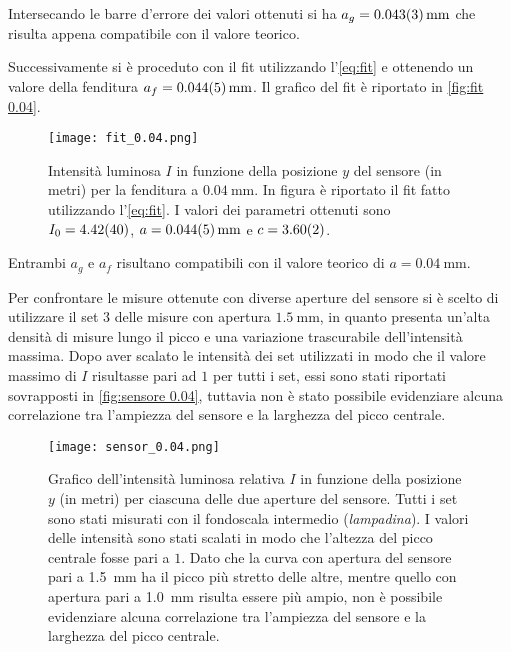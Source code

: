 \documentclass[../main.tex]{subfiles}
\begin{document}
Intersecando le barre d'errore dei valori ottenuti si ha $a_g = \qty{0.043+-0.003}{\mm}$ che risulta appena compatibile con il valore teorico.



\newpage

Successivamente si è proceduto con il fit utilizzando l'\autoref{eq:fit} e ottenendo un valore della fenditura $a_f = \qty{0.044+-0.005}{\mm}$. Il grafico del fit è riportato in \autoref{fig:fit 0.04}.

\begin{figure}[ht!]
    \centering
    \texttt{[image: fit\_0.04.png]}
    \caption{Intensità luminosa $I$ in funzione della posizione $y$ del sensore (in metri) per la fenditura a $\qty{0.04}{\mm}$. In figura è riportato il fit fatto utilizzando l'\autoref{eq:fit}. I valori dei parametri ottenuti sono $I_{0} = \num{4.42+-0.4}$, $a = \qty{0.044+-0.005}{\mm}$ e $c = \num{3.60+-0.02}$. }
    \label{fig:fit 0.04}
\end{figure}

Entrambi $a_g$ e $a_f$ risultano compatibili con il valore teorico di $a = \qty{0.04}{\mm}$.

Per confrontare le misure ottenute con diverse aperture del sensore si è scelto di utilizzare il set $3$ delle misure con apertura $\qty{1.5}{\mm}$, in quanto presenta un'alta densità di misure lungo il picco e una variazione trascurabile dell'intensità massima. Dopo aver scalato le intensità dei set utilizzati in modo che il valore massimo di $I$ risultasse pari ad $1$ per tutti i set, essi sono stati riportati sovrapposti in \autoref{fig:sensore 0.04}, tuttavia non è stato possibile evidenziare alcuna correlazione tra l'ampiezza del sensore e la larghezza del picco centrale.

\begin{figure}[ht!]
    \centering
    \texttt{[image: sensor\_0.04.png]}
    \caption{Grafico dell'intensità luminosa relativa $I$ in funzione della posizione $y$ (in metri) per ciascuna delle due aperture del sensore.
    Tutti i set sono stati misurati con il fondoscala intermedio (\textit{lampadina}). I valori delle intensità sono stati scalati in modo che l'altezza del picco centrale fosse pari a $1$.
    Dato che la curva con apertura del sensore pari a \qty{1.5}{\mm} ha il picco più stretto delle altre, mentre quello con apertura pari a \qty{1.0}{\mm} risulta essere più ampio, non è possibile evidenziare alcuna correlazione tra l'ampiezza del sensore e la larghezza del picco centrale.}
    \label{fig:sensore 0.04}
\end{figure}
\end{document}
